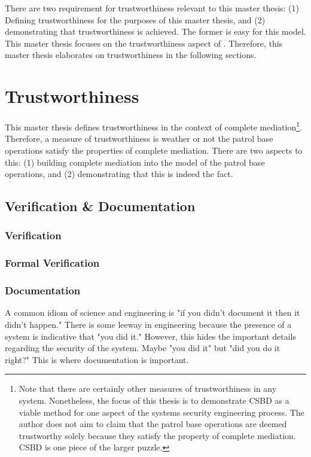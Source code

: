 \documentclass[../../main/main.tex]{subfiles}
\begin{document}
There are two requirement for trustworthiness relevant to this master thesis: (1) Defining trustworthiness for the purposes of this master thesis, and (2) demonstrating that trustworthiness is achieved.  The former is easy for this model.  This master thesis focuses on the trustworthiness aspect of .  Therefore, this master thesis elaborates on trustworthiness in the following sections.

\section{Trustworthiness}\label{sssec:trustworthiness}
This master thesis defines trustworthiness in the context of complete mediation\footnote{Note that there are certainly other measures of trustworthiness in any system.  Nonetheless, the focus of this thesis is to demonstrate CSBD as a viable method for one aspect of the systems security engineering process.  The author does not aim to claim that the patrol base operations are deemed trustworthy solely because they satisfy the property of complete mediation.  CSBD is one piece of the larger puzzle.}.  Therefore, a measure of trustworthiness is weather or not the patrol base operations satisfy the properties of complete mediation.  There are two aspects to this: (1) building complete mediation into the model of the patrol base operations, and (2) demonstrating that this is indeed the fact.  

\subsection{Verification \& Documentation}\label{sssec:sseframework}

\subsubsection{Verification}
\subsubsection{Formal Verification}

\subsubsection{Documentation}


A common idiom of science and engineering is "if you didn't document it then it didn't happen."  There is some leeway in engineering because the presence of a system is indicative that "you did it." However, this hides the important details regarding the security of the system.  Maybe "you did it" but "did you do it right?"  This is where documentation is important. 
\end{document}
